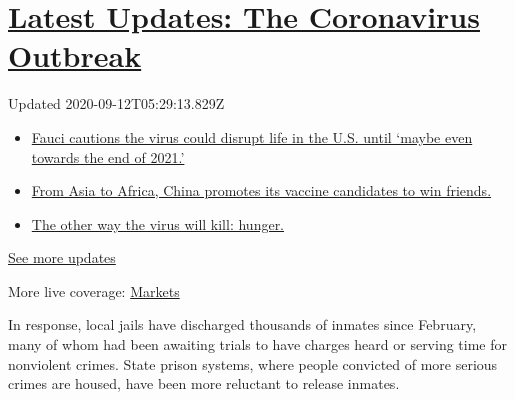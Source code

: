 \hypertarget{latest-updates-the-coronavirus-outbreak}{%
\section{\texorpdfstring{\href{https://www.nytimes3xbfgragh.onion/2020/09/11/world/covid-19-coronavirus.html?action=click\&pgtype=Article\&state=default\&region=MAIN_CONTENT_1\&context=storylines_live_updates}{Latest
Updates: The Coronavirus
Outbreak}}{Latest Updates: The Coronavirus Outbreak}}\label{latest-updates-the-coronavirus-outbreak}}

Updated 2020-09-12T05:29:13.829Z

\begin{itemize}
\tightlist
\item
  \href{https://www.nytimes3xbfgragh.onion/2020/09/11/world/covid-19-coronavirus.html?action=click\&pgtype=Article\&state=default\&region=MAIN_CONTENT_1\&context=storylines_live_updates\#link-dfb8a16}{Fauci
  cautions the virus could disrupt life in the U.S. until `maybe even
  towards the end of 2021.'}
\item
  \href{https://www.nytimes3xbfgragh.onion/2020/09/11/world/covid-19-coronavirus.html?action=click\&pgtype=Article\&state=default\&region=MAIN_CONTENT_1\&context=storylines_live_updates\#link-7104d154}{From
  Asia to Africa, China promotes its vaccine candidates to win friends.}
\item
  \href{https://www.nytimes3xbfgragh.onion/2020/09/11/world/covid-19-coronavirus.html?action=click\&pgtype=Article\&state=default\&region=MAIN_CONTENT_1\&context=storylines_live_updates\#link-393ad215}{The
  other way the virus will kill: hunger.}
\end{itemize}

\href{https://www.nytimes3xbfgragh.onion/2020/09/11/world/covid-19-coronavirus.html?action=click\&pgtype=Article\&state=default\&region=MAIN_CONTENT_1\&context=storylines_live_updates}{See
more updates}

More live coverage:
\href{https://www.nytimes3xbfgragh.onion/live/2020/09/11/business/stock-market-today-coronavirus?action=click\&pgtype=Article\&state=default\&region=MAIN_CONTENT_1\&context=storylines_live_updates}{Markets}

In response, local jails have discharged thousands of inmates since
February, many of whom had been awaiting trials to have charges heard or
serving time for nonviolent crimes. State prison systems, where people
convicted of more serious crimes are housed, have been more reluctant to
release inmates.

